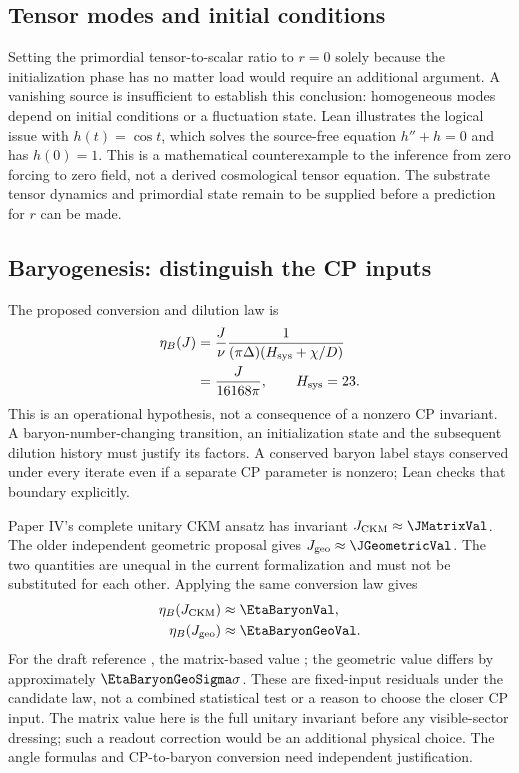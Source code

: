 \subsection{Tensor modes and initial conditions}
Setting the primordial tensor-to-scalar ratio to $r=0$ solely because the initialization phase has no matter load would require an additional argument. A vanishing source is insufficient to establish this conclusion: homogeneous modes depend on initial conditions or a fluctuation state. Lean illustrates the logical issue with $h(t)=\cos t$, which solves the source-free equation $h''+h=0$ and has $h(0)=1$. This is a mathematical counterexample to the inference from zero forcing to zero field, not a derived cosmological tensor equation. The substrate tensor dynamics and primordial state remain to be supplied before a prediction for $r$ can be made.

\subsection{Baryogenesis: distinguish the CP inputs}
The proposed conversion and dilution law is
\begin{equation}
\begin{split}
\eta_B(J)&=\frac{J}{\nu}
\frac{1}{(\pi\Delta)(H_{\rm sys}+\chi/D)}\\
&=\frac{J}{16168\pi},\qquad H_{\rm sys}=23.
\end{split}
\end{equation}
This is an operational hypothesis, not a consequence of a nonzero CP invariant. A baryon-number-changing transition, an initialization state and the subsequent dilution history must justify its factors. A conserved baryon label stays conserved under every iterate even if a separate CP parameter is nonzero; Lean checks that boundary explicitly.

Paper IV's complete unitary CKM ansatz has invariant $J_{\rm CKM}\approx\JMatrixVal$. The older independent geometric proposal gives $J_{\rm geo}\approx\JGeometricVal$. The two quantities are unequal in the current formalization and must not be substituted for each other. Applying the same conversion law gives
\begin{align}
\eta_B(J_{\rm CKM})&\approx\EtaBaryonVal,\\
\eta_B(J_{\rm geo})&\approx\EtaBaryonGeoVal.
\end{align}
For the draft reference \EtaBaryonExperimentalValue, the matrix-based value \EtaBaryonAccText; the geometric value differs by approximately $\EtaBaryonGeoSigma\sigma$. These are fixed-input residuals under the candidate law, not a combined statistical test or a reason to choose the closer CP input. The matrix value here is the full unitary invariant before any visible-sector dressing; such a readout correction would be an additional physical choice. The angle formulas and CP-to-baryon conversion need independent justification.

